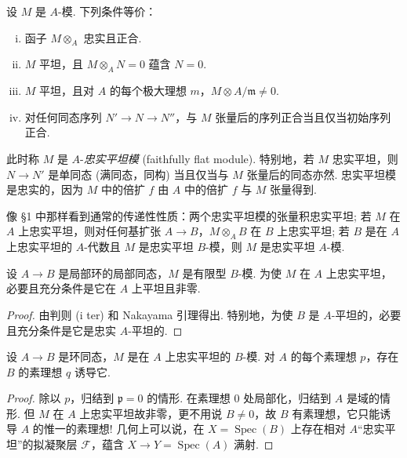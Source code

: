 \begin{proposition}\label{prop:IV.2.1}
设 $M$ 是 $A$-模. 下列条件等价：
\begin{enumerate}[(i)]
\item 函子 $M \otimes_A$ 忠实且正合.
\item[(i bis)] $M$ 平坦，且 $M \otimes_A N = 0$ 蕴含 $N = 0$.
\item[(i ter)] $M$ 平坦，且对 $A$ 的每个极大理想 $m$，$M \otimes A/\mathfrak{m} \neq 0$.
\item 对任何同态序列 $N' \to N \to N''$，与 $M$ 张量后的序列正合当且仅当初始序列正合.
\end{enumerate}
\end{proposition}

此时称 $M$ 是 $A$-\emph{忠实平坦模} (faithfully flat module). 特别地，若 $M$ 忠实平坦，则 $N \to N'$ 是单同态 (满同态，同构) 当且仅当与 $M$ 张量后的同态亦然. 忠实平坦模是忠实的，因为 $M$ 中的倍扩 $f$ 由 $A$ 中的倍扩 $f$ 与 $M$ 张量得到.

像 §1 中那样看到通常的传递性性质：两个忠实平坦模的张量积忠实平坦; 若 $M$ 在 $A$ 上忠实平坦，则对任何基扩张 $A \to B$，$M \otimes_A B$ 在 $B$ 上忠实平坦; 若 $B$ 是在 $A$ 上忠实平坦的 $A$-代数且 $M$ 是忠实平坦 $B$-模，则 $M$ 是忠实平坦 $A$-模.

\begin{corollary}\label{cor:IV.2.2}
设 $A \to B$ 是局部环的局部同态，$M$ 是有限型 $B$-模. 为使 $M$ 在 $A$ 上忠实平坦，必要且充分条件是它在 $A$ 上平坦且非零.
\end{corollary}

\begin{proof}
由判则 (i ter) 和 Nakayama 引理得出. 特别地，为使 $B$ 是 $A$-平坦的，必要且充分条件是它是忠实 $A$-平坦的.
\end{proof}

\begin{proposition}\label{prop:IV.2.3}
设 $A \to B$ 是环同态，$M$ 是在 $A$ 上忠实平坦的 $B$-模. 对 $A$ 的每个素理想 $p$，存在 $B$ 的素理想 $q$ 诱导它.
\end{proposition}

\begin{proof}
除以 $p$，归结到 $\mathfrak{p} = 0$ 的情形. 在素理想 0 处局部化，归结到 $A$ 是域的情形. 但 $M$ 在 $A$ 上忠实平坦故非零，更不用说 $B \neq 0$，故 $B$ 有素理想，它只能诱导 $A$ 的惟一的素理想! 几何上可以说，在 $X = \operatorname{Spec}(B)$ 上存在相对 $A$``忠实平坦''的拟凝聚层 $\mathcal{F}$，蕴含 $X \to Y = \operatorname{Spec}(A)$ 满射.
\end{proof}

